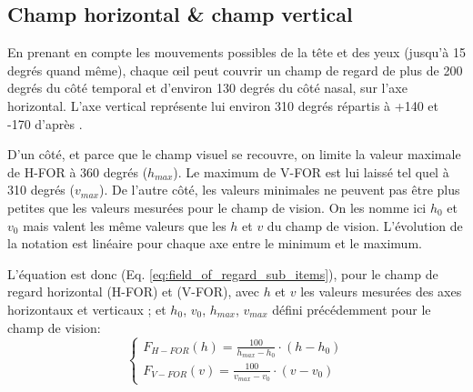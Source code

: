 	\subsection{Champ horizontal \& champ vertical}
	\par En prenant en compte les mouvements possibles de la tête et des yeux (jusqu'à 15 degrés quand même), chaque œil peut couvrir un champ de regard de plus de 200 degrés du côté temporal et d'environ 130 degrés du côté nasal, sur l'axe horizontal. L'axe vertical représente lui environ 310 degrés répartis à +140 et -170 d'après \citep{fuchs_traite_2003}.
	
	\par D'un côté, et parce que le champ visuel se recouvre, on limite la valeur maximale de H-FOR à 360 degrés ($h_{max}$). Le maximum de V-FOR est lui laissé tel quel à 310 degrés ($v_{max}$). De l'autre côté, les valeurs minimales ne peuvent pas être plus petites que les valeurs mesurées pour le champ de vision. On les nomme ici $h_0$ et $v_0$ mais valent les même valeurs que les $h$ et $v$ du champ de vision. L'évolution de la notation est linéaire pour chaque axe entre le minimum et le maximum.
	
	\par L'équation est donc (Eq. \ref{eq:field_of_regard_sub_items}), pour le champ de regard horizontal (H-FOR) et (V-FOR), avec $h$ et $v$ les valeurs mesurées des axes horizontaux et verticaux ; et $h_{0}$, $v_{0}$, $h_{max}$, $v_{max}$ défini précédemment pour le champ de vision:
	\begin{equation}
	\begin{cases}
		F_{H-FOR}(h) = \frac{100}{h_{max} - h_0} \cdot (h - h_0)\\
		F_{V-FOR}(v) = \frac{100}{v_{max} - v_0} \cdot (v - v_0)
	\end{cases}
	\label{eq:field_of_regard_sub_items}
	\end{equation}
	
